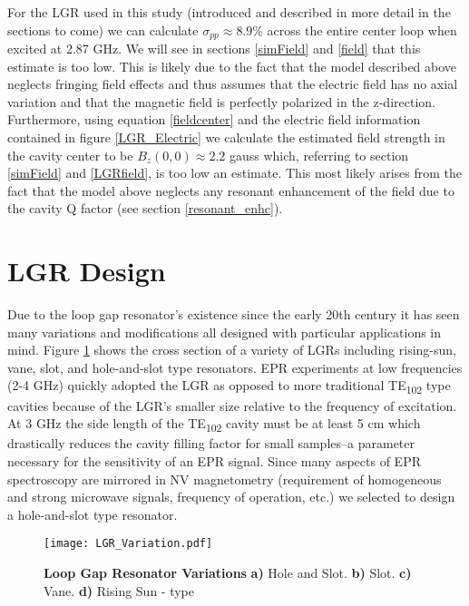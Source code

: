 For the LGR used in this study (introduced and described in more detail in the sections to come) we can calculate $\sigma_{pp} \approx 8.9\%$ across the entire center loop when excited at 2.87 GHz. We will see in sections \ref{simField} and \ref{field} that this estimate is too low. This is likely due to the fact that the model described above neglects fringing field effects and thus assumes that the electric field has no axial variation and that the magnetic field is perfectly polarized in the z-direction. Furthermore, using equation \ref{fieldcenter} and the electric field information contained in figure \ref{LGR_Electric} we calculate the estimated field strength in the cavity center to be $B_z(0,0) \approx 2.2$ gauss which, referring to section \ref{simField} and \ref{LGRfield}, is too low an estimate. This most likely arises from the fact that the model above neglects any resonant enhancement of the field due to the cavity Q factor (see section \ref{resonant_enhc}).


\section{LGR Design} \label{LGRDesignSection}

Due to the loop gap resonator's existence since the early 20th century \cite{collins1948microwave} it has seen many variations and modifications all designed with particular applications in mind. Figure \ref{LGR_variation} shows the cross section of a variety of LGRs including rising-sun, vane, slot, and hole-and-slot type resonators. EPR experiments at low frequencies (2-4 GHz) quickly adopted the LGR as opposed to more traditional TE\textsubscript{102} type cavities because of the LGR's smaller size relative to the frequency of excitation. At 3 GHz the side length of the TE\textsubscript{102} cavity must be at least 5 cm which drastically reduces the cavity filling factor for small samples--a parameter necessary for the sensitivity of an EPR signal. Since many aspects of EPR spectroscopy are mirrored in NV magnetometry (requirement of homogeneous and strong microwave signals, frequency of operation, etc.) we selected to design a hole-and-slot type resonator. 
\vspace{5mm}
\begin{figure}[t!]
\centering
\texttt{[image: LGR\_Variation.pdf]}  
\caption{\textbf{Loop Gap Resonator Variations} \textbf{a)} Hole and Slot. \textbf{b)} Slot. \textbf{c)} Vane. \textbf{d)} Rising Sun - type}
\label{LGR_variation}
\end{figure}


